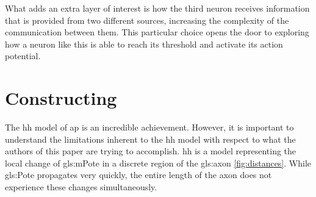 \documentclass[class={myRUCProject}, crop=false]{standalone}
\begin{document}
What adds an extra layer of interest is how the third neuron receives information that is provided from two different sources, increasing the complexity of the communication between them. This particular choice opens the door to exploring how a neuron like this is able to reach its threshold and activate its action potential.














\section{Constructing}
The \gls{hh} model of \gls{ap} is an incredible achievement. However, it is important to understand the limitations inherent to the \gls{hh} model with respect to what the authors of this paper are trying to accomplish.
\gls{hh} is a model representing the local change of \gls{gls:mPote} in a discrete region of the \gls{gls:axon} \cref{fig:distances}. While \gls{gls:Pote} propagates very quickly, the entire length of the axon does not experience these changes simultaneously. 
\end{document}
